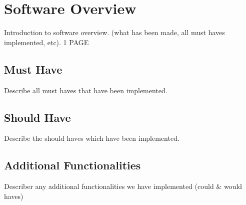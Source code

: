 \chapter{Software Overview} %

Introduction to software overview. (what has been made, all must haves implemented, etc). 1 PAGE

\section{Must Have}
Describe all must haves that have been implemented.

\section{Should Have}
Describe the should haves which have been implemented.

\section{Additional Functionalities}
Describer any additional functionalities we have implemented (could \& would haves)